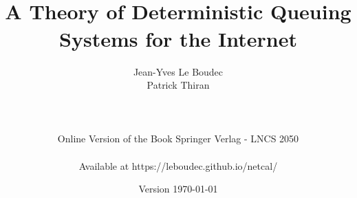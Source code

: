 \documentclass[11pt,twoside,onecolumn,a4paper]{book}
\begin{document}



 \title{
 \\
 A Theory of Deterministic Queuing Systems for the Internet\\
 }
 \author{ {\sc Jean-Yves Le Boudec}  \\{\sc Patrick Thiran}\\
 ~\vspace{1cm}\\
 \framebox[16cm]{\parbox{15cm}{}}
 \\
  ~\vspace{1cm}\\
 Online Version of the Book Springer Verlag - LNCS 2050\\
 ~\\
 Available at https://leboudec.github.io/netcal/
 }



\date{Version \today}

 \maketitle
\frontmatter
\end{document}
